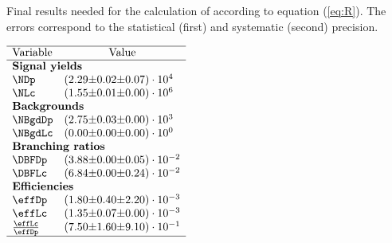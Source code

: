  
\begin{table}[h]
    \centering
    \caption{Final results needed for the calculation of \R according to equation (\ref{eq:R}). The errors correspond to the statistical (first) and systematic (second) precision.}
    \label{tab:table_finalresults.tex}
    $\begin{array}{lr@{\pm}r@{\pm}l}
    \hline
    \text{Variable} & \multicolumn{3}{c}{\text{Value}} \\
    \hline
\multicolumn{4}{l}{\text{\textbf{Signal yields}}} \\
\NDp&(2.29 & 0.02 & 0.07) \cdot 10^{4}\\
\NLc&(1.55 & 0.01 & 0.00) \cdot 10^{6}\\
\multicolumn{4}{l}{\text{\textbf{Backgrounds}}} \\
\NBgdDp&(2.75 & 0.03 & 0.00) \cdot 10^{3}\\
\NBgdLc&(0.00 & 0.00 & 0.00) \cdot 10^{0}\\
\multicolumn{4}{l}{\text{\textbf{Branching ratios}}} \\
\DBFDp&(3.88 & 0.00 & 0.05) \cdot 10^{-2}\\
\DBFLc&(6.84 & 0.00 & 0.24) \cdot 10^{-2}\\
\multicolumn{4}{l}{\text{\textbf{Efficiencies}}} \\
\effDp&(1.80 & 0.40 & 2.20) \cdot 10^{-3}\\
\effLc&(1.35 & 0.07 & 0.00) \cdot 10^{-3}\\
\frac{\effLc}{\effDp}&(7.50 & 1.60 & 9.10) \cdot 10^{-1}\\

    \hline
    \end{array}$
\end{table}
